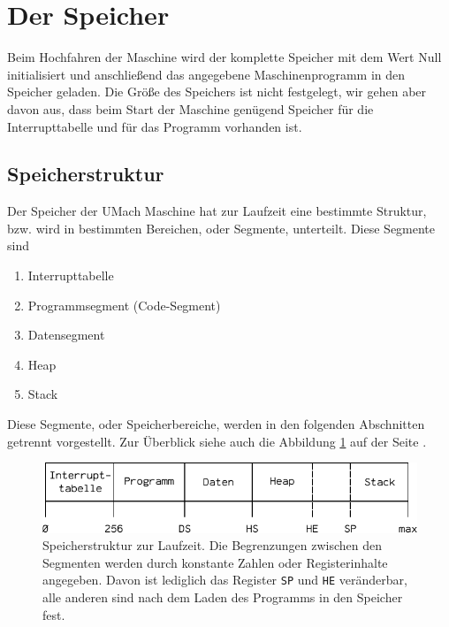 \section{Der Speicher}
\label{sec:Speicher}

Beim Hochfahren der Maschine wird der komplette Speicher mit dem
Wert Null initialisiert und anschließend das angegebene Maschinenprogramm in den
Speicher geladen. Die Größe des Speichers ist nicht festgelegt, wir gehen aber
davon aus, dass beim Start der Maschine genügend Speicher für die
Interrupttabelle und für das Programm vorhanden ist.


\subsection{Speicherstruktur}
\label{subsec:Speicherstruktur}

Der Speicher der UMach Maschine hat zur Laufzeit eine bestimmte Struktur, bzw.
wird in bestimmten Bereichen, oder Segmente, unterteilt. Diese
Segmente sind
\begin{enumerate}
 \item Interrupttabelle
 \item Programmsegment (Code-Segment)
 \item Datensegment
 \item Heap
 \item Stack
\end{enumerate}

Diese Segmente, oder Speicherbereiche, werden in den folgenden Abschnitten
getrennt vorgestellt. Zur Überblick  siehe auch die Abbildung
\ref{fig:Speicherstruktur} auf der Seite \pageref{fig:Speicherstruktur}.

\begin{figure}[htp]
 \centering
 \includegraphics{./img/UMach-Speicherstruktur}
 \caption[Speicherstruktur]
         {Speicherstruktur zur Laufzeit. Die Begrenzungen zwischen den
          Segmenten werden durch konstante Zahlen oder Registerinhalte
          angegeben. Davon ist lediglich das Register \texttt{SP}
          und \texttt{HE} veränderbar, alle anderen sind nach dem Laden des
          Programms in den Speicher fest.}
 \label{fig:Speicherstruktur}
\end{figure}



